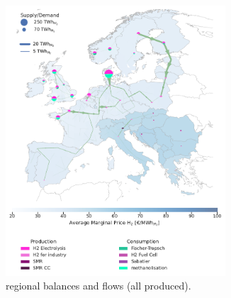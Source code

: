 \documentclass[preprint,12pt]{elsarticle}
\begin{document}
\begin{figure}[htbp]
  \centering
  \begin{subfigure}[t]{0.47\textwidth} %
      \vspace{0pt}
      \includegraphics[width=0.9\textwidth]{balance_map_h2_base} %
      \vspace{0.3cm}
      \caption{ regional balances and flows (all  produced).}
      \label{fig:balance_map_h2_base}
  \end{subfigure}
  \hfill
  \begin{subfigure}[t]{0.47\textwidth} %
      \vspace{0pt}

\end{subfigure}
\end{figure}
\end{document}
